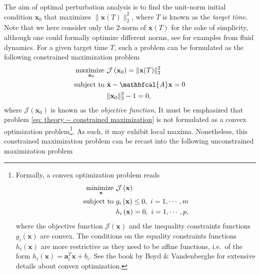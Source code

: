       The aim of optimal perturbation analysis is to find the unit-norm initial condition $\mathbf{x}_0$ that maximizes $\| \mathbf{x}(T) \|_2^2$, where $T$ is known as the \emph{target time}. Note that we here consider only the 2-norm of $\mathbf{x}(T)$ for the sake of simplicity, although one could formally optimize different norms, see \cite{??} for examples from fluid dynamics. For a given target time $T$, such a problem can be formulated as the following constrained maximization problem
      \begin{equation}
          \begin{aligned}
            \maximize \limits_{\mathbf{x}_0} & \mathcal{J} \left( \mathbf{x}_0 \right) = \| \mathbf{x}(T) \|_2^2\\
            \subjecto & \dot{\mathbf{x}} - \mathbfcal{A}\mathbf{x} = 0 \\
            ~ & \| \mathbf{x}_0 \|_2^2 - 1 = 0,
          \end{aligned}
          \label{eq: theory -- constrained maximization}
      \end{equation}
      where $\mathcal{J}(\mathbf{x}_{0})$ is known as the \emph{objective function}. It must be emphasized that problem \eqref{eq: theory -- constrained maximization} is not formulated as a convex optimization problem\footnote{
      Formally, a convex optimization problem reads
      \begin{equation}
        \begin{aligned}
          \operatorname*{minimize~} \limits_{\mathbf{x}} & \mathcal{J} \left( \mathbf{x} \right) \\
          \operatorname{subject~to~} & g_i \left( \mathbf{x} \right) \leq 0, \ i = 1, \cdots, m \\
          ~ & h_i \left( \mathbf{x} \right) = 0, \ i = 1, \cdots, p,
        \end{aligned}
        \notag
      \end{equation}
      where the objective function $\mathcal{J} \left( \mathbf{x} \right)$ and the inequality constraints functions $g_i \left( \mathbf{x} \right)$ are convex. The conditions on the equality constraints functions $h_i \left( \mathbf{x} \right)$ are more restrictive as they need to be affine functions, i.e.\ of the form $h_i \left( \mathbf{x} \right) = \mathbf{a}_i^T \mathbf{x} + b_i$. See the book by Boyd \& Vandenberghe \cite{book:boyd:2004} for extensive details about convex optimization.}.
      As such, it may exhibit local maxima. Nonetheless, this constrained maximization problem can be recast into the following unconstrained maximization problem
